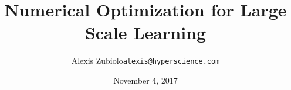 \documentclass{beamer}
\title[Course presentation]{Numerical Optimization for Large Scale Learning}
\author{Alexis Zubiolo\newline\texttt{alexis@hyperscience.com}}
\institute{Machine Learning Engineer @ HyperScience}
\date{November 4, 2017}
\begin{document}
\begin{frame}
  \titlepage
\end{frame}
\end{document}
